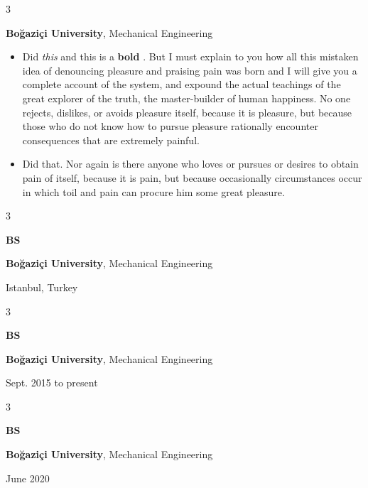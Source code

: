 \documentclass[10pt, letterpaper]{article}
\newenvironment{highlights}{
    \begin{itemize}[
        topsep=0.10 cm,
        parsep=0.10 cm,
        partopsep=0pt,
        itemsep=0pt,
        leftmargin=0.4 cm + 10pt
    ]
}{
    \end{itemize}
} %
\newenvironment{threecolentry}[3][]{
    \onecolentry
    \def\thirdColumn{#3}
    \setcolumnwidth{1 cm, \fill, 4.5 cm}
    \begin{paracol}{3}
    {\raggedright #2} \switchcolumn
}{
    \switchcolumn \raggedleft \thirdColumn
    \end{paracol}
    \endonecolentry
} %
\let\hrefWithoutArrow\href
\renewcommand{\href}[2]{\hrefWithoutArrow{#1}{\mbox{\ifthenelse{\equal{#2}{}}{ }{#2 }\raisebox{.15ex}{\footnotesize \faExternalLink*}}}}
\begin{document}
        \begin{threecolentry}{\textbf{}}{
            
        }
            \textbf{Boğaziçi University}, Mechanical Engineering
            \begin{highlights}
                \item Did \textit{this} and this is a \textbf{bold} \href{https://example.com}{link}. But I must explain to you how all this mistaken idea of denouncing pleasure and praising pain was born and I will give you a complete account of the system, and expound the actual teachings of the great explorer of the truth, the master-builder of human happiness. No one rejects, dislikes, or avoids pleasure itself, because it is pleasure, but because those who do not know how to pursue pleasure rationally encounter consequences that are extremely painful.
                \item Did that. Nor again is there anyone who loves or pursues or desires to obtain pain of itself, because it is pain, but because occasionally circumstances occur in which toil and pain can procure him some great pleasure.
            \end{highlights}
        \end{threecolentry}

        \vspace{0.2 cm}

        \begin{threecolentry}{\textbf{BS}}{
            Istanbul, Turkey
        }
            \textbf{Boğaziçi University}, Mechanical Engineering
        \end{threecolentry}

        \vspace{0.2 cm}

        \begin{threecolentry}{\textbf{BS}}{
            Sept. 2015 to present
        }
            \textbf{Boğaziçi University}, Mechanical Engineering
        \end{threecolentry}

        \vspace{0.2 cm}

        \begin{threecolentry}{\textbf{BS}}{
            June 2020
        }
            \textbf{Boğaziçi University}, Mechanical Engineering
        \end{threecolentry}

        \vspace{0.2 cm}
\end{document}
